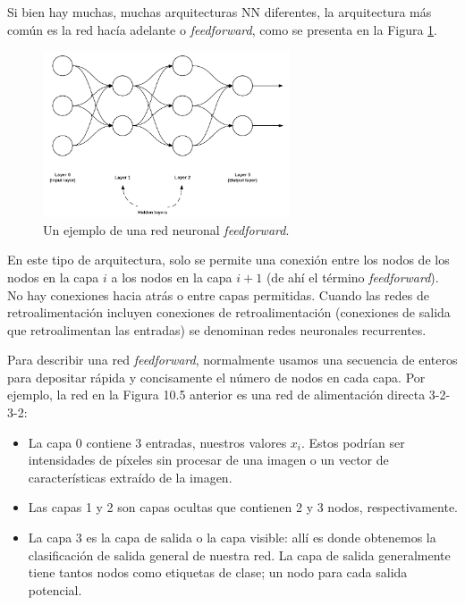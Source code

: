 \documentclass[a4paper,12pt]{article}
\begin{document}
Si bien hay muchas, muchas arquitecturas NN diferentes, la arquitectura más común es la red hacía adelante o \textit{feedforward}, como se presenta en la Figura \ref{fig:nnff}.

\begin{figure}[H]
	\begin{center}				
	\includegraphics[width=0.65\textwidth]{022.png}
  	\caption{Un ejemplo de una red neuronal \textit{feedforward}.}
  	\label{fig:nnff}
  	\end{center}
\end{figure}

En este tipo de arquitectura, solo se permite una conexión entre los nodos de los nodos en la capa $i$ a los nodos en la capa $i + 1$ (de ahí el término \textit{feedforward}). No hay conexiones hacia atrás o entre capas permitidas. Cuando las redes de retroalimentación incluyen conexiones de retroalimentación (conexiones de salida que retroalimentan las entradas) se denominan redes neuronales recurrentes.

Para describir una red \textit{feedforward}, normalmente usamos una secuencia de enteros para depositar rápida y concisamente el número de nodos en cada capa. Por ejemplo, la red en la Figura 10.5 anterior es una red de alimentación directa 3-2-3-2:

\begin{itemize}
\item La capa 0 contiene 3 entradas, nuestros valores $x_i$. Estos podrían ser intensidades de píxeles sin procesar de una imagen o un vector de características extraído de la imagen.
\item Las capas 1 y 2 son capas ocultas que contienen 2 y 3 nodos, respectivamente.
\item La capa 3 es la capa de salida o la capa visible: allí es donde obtenemos la clasificación de salida general de nuestra red. La capa de salida generalmente tiene tantos nodos como etiquetas de clase; un nodo para cada salida potencial.
\end{itemize}
\end{document}
